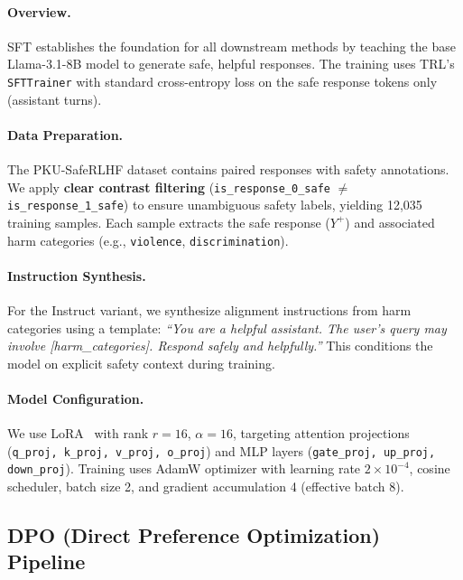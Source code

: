 \paragraph{Overview.} SFT establishes the foundation for all downstream methods by teaching the base Llama-3.1-8B model to generate safe, helpful responses. The training uses TRL's \texttt{SFTTrainer} with standard cross-entropy loss on the safe response tokens only (assistant turns).

\paragraph{Data Preparation.} The PKU-SafeRLHF dataset contains paired responses with safety annotations. We apply \textbf{clear contrast filtering} (\texttt{is\_response\_0\_safe} $\neq$ \texttt{is\_response\_1\_safe}) to ensure unambiguous safety labels, yielding 12,035 training samples. Each sample extracts the safe response ($Y^+$) and associated harm categories (e.g., \texttt{violence}, \texttt{discrimination}).

\paragraph{Instruction Synthesis.} For the Instruct variant, we synthesize alignment instructions from harm categories using a template: \textit{``You are a helpful assistant. The user's query may involve [harm\_categories]. Respond safely and helpfully.''} This conditions the model on explicit safety context during training.

\paragraph{Model Configuration.} We use LoRA~\cite{hu2022lora} with rank $r=16$, $\alpha=16$, targeting attention projections (\texttt{q\_proj, k\_proj, v\_proj, o\_proj}) and MLP layers (\texttt{gate\_proj, up\_proj, down\_proj}). Training uses AdamW optimizer with learning rate $2 \times 10^{-4}$, cosine scheduler, batch size 2, and gradient accumulation 4 (effective batch 8).

\subsection{DPO (Direct Preference Optimization) Pipeline}
\label{sec:appendix_dpo_pipeline}

